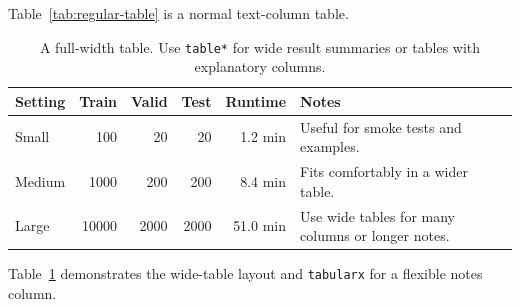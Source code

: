 Table~\ref{tab:regular-table} is a normal text-column table.

\begin{table}
	\centering
	\small
	\begin{tabularx}{0.95\linewidth}{lrrrrX}
		\toprule
		Setting & Train & Valid & Test & Runtime & Notes \\
		\midrule
		Small & 100 & 20 & 20 & 1.2 min & Useful for smoke tests and examples. \\
		Medium & 1000 & 200 & 200 & 8.4 min & Fits comfortably in a wider table. \\
		Large & 10000 & 2000 & 2000 & 51.0 min & Use wide tables for many columns or longer notes. \\
		\bottomrule
	\end{tabularx}
	\caption{A full-width table. Use \texttt{table*} for wide result summaries
	or tables with explanatory columns.}
	\label{tab:full-width-table}
\end{table}

Table~\ref{tab:full-width-table} demonstrates the wide-table layout and
\texttt{tabularx} for a flexible notes column.

